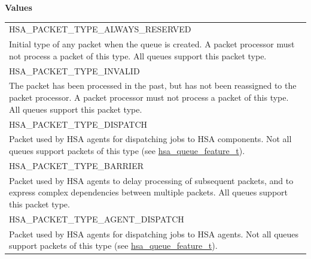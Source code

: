 \documentclass[final]{book}
\newcommand{\reftyp}[1]{#1}
\newcommand{\refenu}[1]{\reftyp{#1}}
\begin{document}
\noindent\textbf{Values}\\[-5mm]
\begin{longtable}{@{\hspace{2em}}p{\linewidth-2em}}
\hspace{-2em}\refenu{HSA_\-PACKET_\-TYPE_\-ALWAYS_\-RESERVED}\\Initial type of any packet when the queue is created. A packet processor must not process a packet of this type. All queues support this packet type.\\[2mm]
\hspace{-2em}\refenu{HSA_\-PACKET_\-TYPE_\-INVALID}\\The packet has been processed in the past, but has not been reassigned to the packet processor. A packet processor must not process a packet of this type. All queues support this packet type.\\[2mm]
\hspace{-2em}\refenu{HSA_\-PACKET_\-TYPE_\-DISPATCH}\\Packet used by HSA agents for dispatching jobs to HSA components. Not all queues support packets of this type (see \hyperlink{group__queue_1ga1145b01f6d9e2670179a22c92db39413}{hsa_\-queue_\-feature_\-t}).\\[2mm]
\hspace{-2em}\refenu{HSA_\-PACKET_\-TYPE_\-BARRIER}\\Packet used by HSA agents to delay processing of subsequent packets, and to express complex dependencies between multiple packets. All queues support this packet type.\\[2mm]
\hspace{-2em}\refenu{HSA_\-PACKET_\-TYPE_\-AGENT_\-DISPATCH}\\Packet used by HSA agents for dispatching jobs to HSA agents. Not all queues support packets of this type (see \hyperlink{group__queue_1ga1145b01f6d9e2670179a22c92db39413}{hsa_\-queue_\-feature_\-t}).
\end{longtable}
\end{document}
